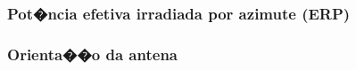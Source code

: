 \subsubsection{Pot�ncia efetiva irradiada por azimute (ERP)}

\subsubsection{Orienta��o da antena}















